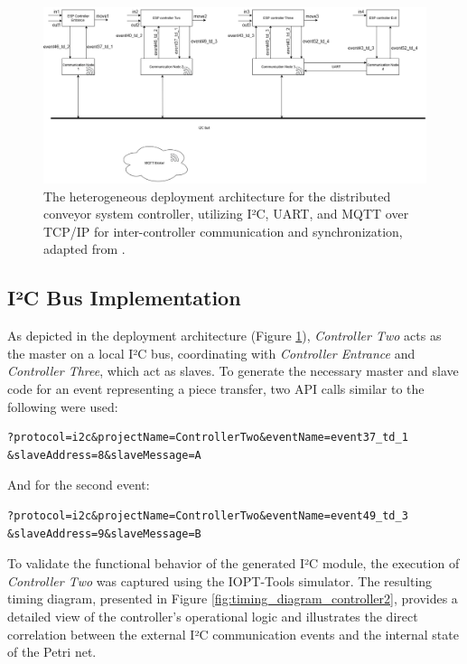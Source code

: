 \begin{figure}[htb]
    \centering
    \includegraphics[width=1\textwidth]{Chapters/Figures/prototypelayout.png}
\caption{The heterogeneous deployment architecture for the distributed conveyor system controller, utilizing I²C, UART, and MQTT over TCP/IP for inter-controller communication and synchronization, adapted from \cite{tavaresgomes2026}.}
    \label{fig:deployment_layout}
\end{figure}


\subsection{I²C Bus Implementation}
As depicted in the deployment architecture (Figure \ref{fig:deployment_layout}), \textit{Controller Two} acts as the master on a local I²C bus, coordinating with \textit{Controller Entrance} and \textit{Controller Three}, which act as slaves. To generate the necessary master and slave code for an event representing a piece transfer, two API calls similar to the following were used:

\begin{verbatim}
?protocol=i2c&projectName=ControllerTwo&eventName=event37_td_1
&slaveAddress=8&slaveMessage=A
\end{verbatim}

And for the second event:
\begin{verbatim}
?protocol=i2c&projectName=ControllerTwo&eventName=event49_td_3
&slaveAddress=9&slaveMessage=B
\end{verbatim}

To validate the functional behavior of the generated I²C module, the execution of \textit{Controller Two} was captured using the IOPT-Tools simulator. The resulting timing diagram, presented in Figure \ref{fig:timing_diagram_controller2}, provides a detailed view of the controller's operational logic and illustrates the direct correlation between the external I²C communication events and the internal state of the Petri net.  


